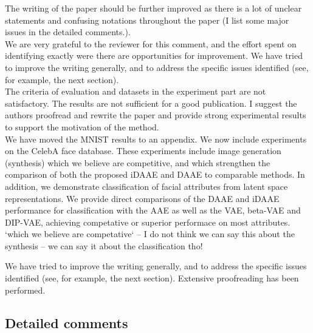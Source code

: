 \documentclass{article}
\begin{document}

{\color{blue} The writing of the paper should be further improved as there is a lot of unclear statements and confusing notations throughout the paper (I list some major issues in the detailed comments.).} \\

We are very grateful to the reviewer for this comment, and the effort spent on identifying exactly were there are opportunities for improvement. We have tried to improve the writing generally, and to address the specific issues identified (see, for example, the next section). \\

{\color{blue} The criteria of evaluation and datasets in the experiment part are not satisfactory. The results are not sufficient for a good publication. I suggest the authors proofread and rewrite the paper and provide strong experimental results to support the motivation of the method.}\\

We have {\color{red} moved} the MNIST results to an appendix. We now include experiments on the CelebA face database.  These experiments include image generation (synthesis) which we believe are competitive, and which strengthen the comparison of both the proposed iDAAE and DAAE to comparable methods. In addition, we demonstrate classification of {\color{red} facial attributes} from latent space representations. We provide direct comparisons of the DAAE and iDAAE performance for classification with the AAE {\color{red} as well as the VAE, beta-VAE and DIP-VAE, achieving competative or superior performace on most attributes}.\\

{\color{red} `which we believe are competative` -- I do not think we can say this about the synthesis -- we can say it about the classification tho!}

We have tried to improve the writing generally, and to address the specific issues identified (see, for example, the next section). Extensive proofreading has been performed.

\subsection*{Detailed comments}
\end{document}
